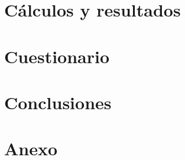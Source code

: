 \documentclass[10pt]{article}
\begin{document}
\section{C\'{a}lculos y resultados}

\section{Cuestionario}
\section{Conclusiones}
\section{Anexo}
\end{document}
